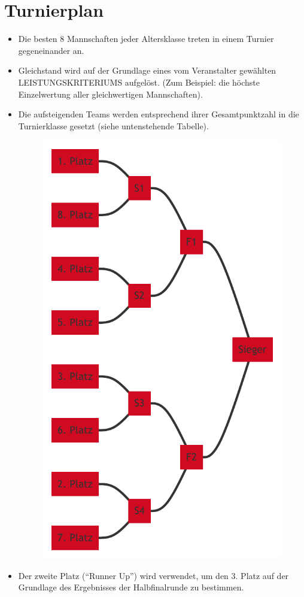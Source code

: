 \documentclass[a4paper,12pt]{article}
\begin{document}
\section{Turnierplan}
\begin{itemize}
	\item Die besten 8 Mannschaften jeder Altersklasse treten in einem
		Turnier gegeneinander an.
	\item Gleichstand wird auf der Grundlage eines vom Veranstalter
		gewählten LEISTUNGSKRITERIUMS aufgelöst. (Zum Beispiel: die
		höchste Einzelwertung aller gleichwertigen Mannschaften).
	\item Die aufsteigenden Teams werden entsprechend ihrer Gesamtpunktzahl
		in die Turnierklasse gesetzt (siehe untenstehende Tabelle).
		\begin{figure}[H]
			\centering
			\def\svgwidth{\columnwidth}
			\includegraphics{tournament_score/tournament_score.pdf}
		\end{figure}
	\item Der zweite Platz ("`Runner Up"') wird verwendet, um den 3. Platz
		auf der Grundlage des Ergebnisses der Halbfinalrunde zu
		bestimmen.
\end{itemize}
\end{document}
